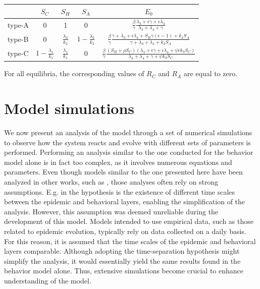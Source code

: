 \begin{center}
\begin{tabular}{|>{\centering\arraybackslash}m{1.2cm}|c|c|c|c|}
	\hline
	\rule[0ex]{0pt}{2.5ex}  & $S_C$ & $S_H$ & $S_A$ & $E_0$ \\
	\hline
	\rule[0ex]{0pt}{2.5ex} type-A & 0  & 1 & 0  
	& $\frac{\beta}{\gamma} \frac{\lambda_3+\epsilon \gamma + \epsilon \lambda_4}{\lambda_3 + \lambda_4 + \gamma}$  \\
	\hline
	\rule[0ex]{0pt}{2.5ex} type-B & 0 & $\frac{\lambda_2}{k_2}$ & $1- \frac{\lambda_2}{k_2}$  
	& 	$\frac{\beta}{\gamma} \frac{\gamma +\lambda_3+\epsilon \lambda_4 + S_H \gamma(\epsilon-1)+k_4 S_A}{\gamma+\lambda_3+ \lambda_4+ k_4 S_A}$  \\
	\hline
	\rule[0ex]{0pt}{2.5ex} type-C & $1 -\frac{\lambda_1}{k_1}$ & $\frac{\lambda_1}{k_1}$ & 0 
	& $ \frac{\beta}{\gamma} \frac{(S_H+ \rho S_C)(\lambda_3+\epsilon \gamma + \epsilon \lambda_4+ \psi \epsilon k_3 S_C)}{\lambda_3 + \lambda_4 + \gamma + \psi k_3 S_C}  $  \\
	\hline
\end{tabular}
\end{center}


For all equilibria, the corresponding values of $R_C$ and $R_A$ are equal to zero.

\section{Model simulations}
We now present an analysis of the model through a set of numerical simulations to observe how the system reacts and evolve with different sets of parameters is performed.
Performing an analysis similar to the one conducted for the behavior model alone is in fact too complex, as it involves numerous equations and parameters. Even though models similar to the one presented here have been analyzed in other works, such as \cite{Bulai2023}, those analyses often rely on strong assumptions. E.g. in \cite{Bulai2023} the hypothesis is the existence of different time scales between the epidemic and behavioral layers, enabling the simplification of the analysis. However, this assumption was deemed unreliable during the development of this model. Models intended to use empirical data, such as those related to epidemic evolution, typically rely on data collected on a daily basis. For this reason, it is assumed that the time scales of the epidemic and behavioral layers comparable. Although adopting the time-separation hypothesis might simplify the analysis, it would essentially yield the same results found in the behavior model alone. Thus, extensive simulations become crucial to enhance understanding of the model.

